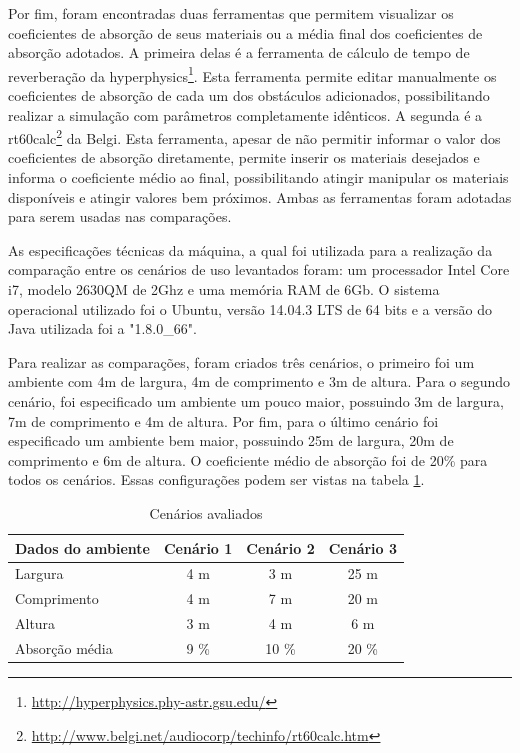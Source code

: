 Por fim, foram encontradas duas ferramentas que permitem visualizar os coeficientes de absorção de seus materiais ou a média final dos coeficientes de absorção adotados. A primeira delas é a ferramenta de cálculo de tempo de reverberação da hyperphysics\footnote{\url{http://hyperphysics.phy-astr.gsu.edu/}}. Esta ferramenta permite editar manualmente os coeficientes de absorção de cada um dos obstáculos adicionados, possibilitando realizar a simulação com parâmetros completamente idênticos. A segunda é a rt60calc\footnote{\url{http://www.belgi.net/audiocorp/techinfo/rt60calc.htm}} da Belgi. Esta ferramenta, apesar de não permitir informar o valor dos coeficientes de absorção diretamente, permite inserir os materiais desejados e informa o coeficiente médio ao final, possibilitando atingir manipular os materiais disponíveis e atingir valores bem próximos. Ambas as ferramentas foram adotadas para serem usadas nas comparações.

As especificações técnicas da máquina, a qual foi utilizada para a realização da comparação entre os cenários de uso levantados foram: um processador Intel Core i7, modelo 2630QM de 2Ghz e uma memória RAM de 6Gb. O sistema operacional utilizado foi o Ubuntu,
versão 14.04.3 LTS de 64 bits e a versão do Java utilizada foi a "1.8.0\_66".

Para realizar as comparações, foram criados três cenários, o primeiro foi um ambiente com 4m de largura, 4m de comprimento e 3m de altura. Para o segundo cenário, foi especificado um ambiente um pouco maior, possuindo 3m de largura, 7m de comprimento e 4m de altura. Por fim, para o último cenário foi especificado um ambiente bem maior, possuindo 25m de largura, 20m de comprimento e 6m de altura. O coeficiente médio de absorção foi de 20\% para todos os cenários. Essas configurações podem ser vistas na tabela \ref{cenarios}. 

\begin{table}[]
\centering
\caption{Cenários avaliados}
\label{cenarios}
\begin{tabular}{|l|c|c|c|}
\hline
\textbf{Dados do ambiente} & \multicolumn{1}{l|}{\textbf{Cenário 1}} & \multicolumn{1}{l|}{\textbf{Cenário 2}} & \multicolumn{1}{l|}{\textbf{Cenário 3}} \\ \hline
Largura              & 4 m                  & 3 m                & 25 m            \\
Comprimento          & 4 m                  & 7 m                & 20 m            \\
Altura               & 3 m                  & 4 m                & 6  m            \\
Absorção média       & 9 \%                 & 10 \%              & 20 \%           \\ \hline
\end{tabular}
\end{table}

